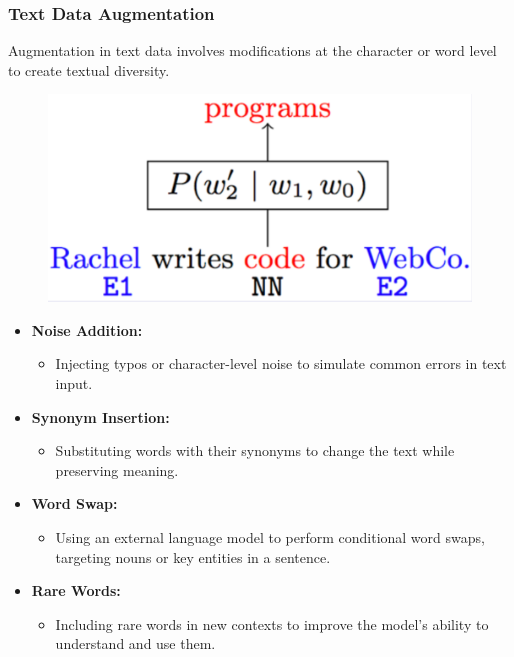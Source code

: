 \subsubsection{Text Data Augmentation}
Augmentation in text data involves modifications at the character or word level to create textual diversity.

\begin{figure}[H]
    \centering
    \includegraphics[width=0.5\linewidth]{img/text_aug.png}
    
    
\end{figure}

\begin{itemize}
    \item \textbf{Noise Addition:}
    \begin{itemize}
        \item Injecting typos or character-level noise to simulate common errors in text input.
    \end{itemize}
    
    \item \textbf{Synonym Insertion:}
    \begin{itemize}
        \item Substituting words with their synonyms to change the text while preserving meaning.
    \end{itemize}
    
    \item \textbf{Word Swap:}
    \begin{itemize}
        \item Using an external language model to perform conditional word swaps, targeting nouns or key entities in a sentence.
    \end{itemize}
    
    \item \textbf{Rare Words:}
    \begin{itemize}
        \item Including rare words in new contexts to improve the model's ability to understand and use them.
    \end{itemize}
\end{itemize}

